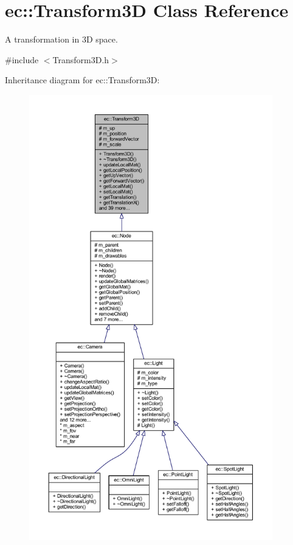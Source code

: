 \hypertarget{classec_1_1_transform3_d}{}\section{ec\+:\+:Transform3D Class Reference}
\label{classec_1_1_transform3_d}


A transformation in 3D space.  




{\ttfamily \#include $<$Transform3\+D.\+h$>$}



Inheritance diagram for ec\+:\+:Transform3D\+:\nopagebreak
\begin{figure}[H]
\begin{center}
\leavevmode
\includegraphics[height=550pt]{classec_1_1_transform3_d__inherit__graph}
\end{center}
\end{figure}


